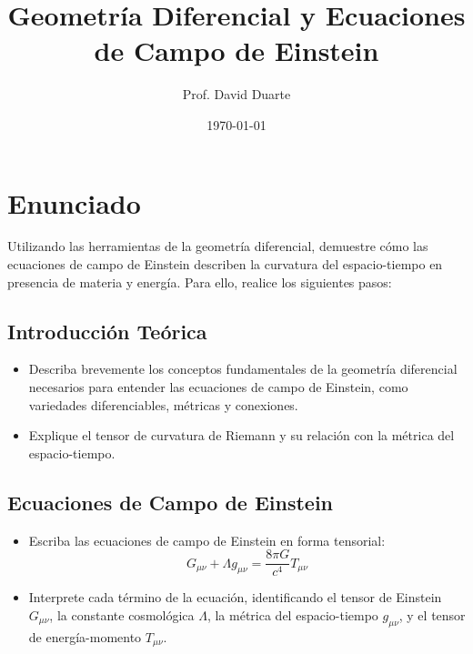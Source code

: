 \documentclass{article}
\begin{document}
	
	\title{Geometría Diferencial y Ecuaciones de Campo de Einstein}
	\author{Prof. David Duarte}
	\date{\today}
	
	\maketitle
	
	\section*{Enunciado}
	
	Utilizando las herramientas de la geometría diferencial, demuestre cómo las ecuaciones de campo de Einstein describen la curvatura del espacio-tiempo en presencia de materia y energía. Para ello, realice los siguientes pasos:
	
	\subsection*{Introducción Teórica}
	\begin{itemize}
		\item Describa brevemente los conceptos fundamentales de la geometría diferencial necesarios para entender las ecuaciones de campo de Einstein, como variedades diferenciables, métricas y conexiones.
		\item Explique el tensor de curvatura de Riemann y su relación con la métrica del espacio-tiempo.
	\end{itemize}
	
	\subsection*{Ecuaciones de Campo de Einstein}
	\begin{itemize}
		\item Escriba las ecuaciones de campo de Einstein en forma tensorial:
		\begin{equation}
			G_{\mu\nu} + \Lambda g_{\mu\nu} = \frac{8\pi G}{c^4} T_{\mu\nu}
		\end{equation}
		\item Interprete cada término de la ecuación, identificando el tensor de Einstein \( G_{\mu\nu} \), la constante cosmológica \( \Lambda \), la métrica del espacio-tiempo \( g_{\mu\nu} \), y el tensor de energía-momento \( T_{\mu\nu} \).
	\end{itemize}
	
\end{document}
